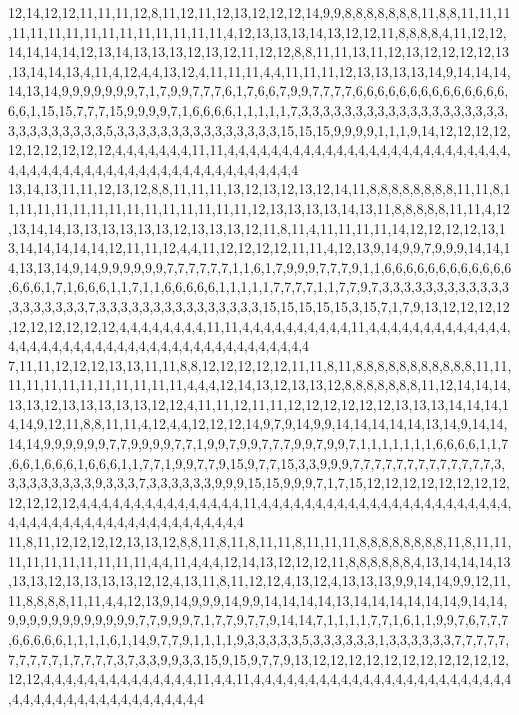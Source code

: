 12,14,12,12,11,11,11,12,8,11,12,11,12,13,12,12,12,14,9,9,8,8,8,8,8,8,8,11,8,8,11,11,11,11,11,11,11,11,11,11,11,11,11,11,11,4,12,13,13,13,14,13,12,12,11,8,8,8,8,4,11,12,12,14,14,14,14,12,13,14,13,13,13,12,13,12,11,12,12,8,8,11,11,13,11,12,13,12,12,12,12,13,13,14,14,13,4,11,4,12,4,4,13,12,4,11,11,11,4,4,11,11,11,12,13,13,13,13,14,9,14,14,14,14,13,14,9,9,9,9,9,9,9,7,1,7,9,9,7,7,7,6,1,7,6,6,7,9,9,7,7,7,7,6,6,6,6,6,6,6,6,6,6,6,6,6,6,6,6,1,15,15,7,7,7,15,9,9,9,9,7,1,6,6,6,6,1,1,1,1,1,7,3,3,3,3,3,3,3,3,3,3,3,3,3,3,3,3,3,3,3,3,3,3,3,3,3,3,3,3,5,3,3,3,3,3,3,3,3,3,3,3,3,3,3,3,15,15,15,9,9,9,9,1,1,1,9,14,12,12,12,12,12,12,12,12,12,12,4,4,4,4,4,4,4,11,11,4,4,4,4,4,4,4,4,4,4,4,4,4,4,4,4,4,4,4,4,4,4,4,4,4,4,4,4,4,4,4,4,4,4,4,4,4,4,4,4,4,4,4,4,4,4,4,4,4,4,4,4,4
13,14,13,11,11,12,13,12,8,8,11,11,11,13,12,13,12,13,12,14,11,8,8,8,8,8,8,8,8,11,11,8,11,11,11,11,11,11,11,11,11,11,11,11,11,11,12,13,13,13,13,14,13,11,8,8,8,8,8,11,11,4,12,13,14,14,13,13,13,13,13,13,12,13,13,13,12,11,8,11,4,11,11,11,11,14,12,12,12,12,13,13,14,14,14,14,14,12,11,11,12,4,4,11,12,12,12,12,11,11,4,12,13,9,14,9,9,7,9,9,9,14,14,14,13,13,14,9,14,9,9,9,9,9,9,7,7,7,7,7,7,1,1,6,1,7,9,9,9,7,7,7,9,1,1,6,6,6,6,6,6,6,6,6,6,6,6,6,6,6,1,7,1,6,6,6,1,1,7,1,1,6,6,6,6,6,1,1,1,1,1,7,7,7,7,1,1,7,7,9,7,3,3,3,3,3,3,3,3,3,3,3,3,3,3,3,3,3,3,3,7,3,3,3,3,3,3,3,3,3,3,3,3,3,3,3,15,15,15,15,15,3,15,7,1,7,9,13,12,12,12,12,12,12,12,12,12,12,4,4,4,4,4,4,4,4,11,11,4,4,4,4,4,4,4,4,4,4,11,4,4,4,4,4,4,4,4,4,4,4,4,4,4,4,4,4,4,4,4,4,4,4,4,4,4,4,4,4,4,4,4,4,4,4,4,4,4,4,4,4
7,11,11,12,12,12,13,13,11,11,8,8,12,12,12,12,12,11,11,8,11,8,8,8,8,8,8,8,8,8,8,8,11,11,11,11,11,11,11,11,11,11,11,11,4,4,4,12,14,13,12,13,13,12,8,8,8,8,8,8,8,11,12,14,14,14,13,13,12,13,13,13,13,13,12,12,4,11,11,12,11,11,12,12,12,12,12,12,13,13,13,14,14,14,14,14,9,12,11,8,8,11,11,4,12,4,4,12,12,12,14,9,7,9,14,9,9,14,14,14,14,14,13,14,9,14,14,14,14,9,9,9,9,9,9,7,7,9,9,9,9,7,7,1,9,9,7,9,9,7,7,7,9,9,7,9,9,7,1,1,1,1,1,1,1,6,6,6,6,1,1,7,6,6,1,6,6,6,1,6,6,6,1,1,7,7,1,9,9,7,7,9,15,9,7,7,15,3,3,9,9,9,7,7,7,7,7,7,7,7,7,7,7,7,7,3,3,3,3,3,3,3,3,3,9,3,3,3,7,3,3,3,3,3,3,9,9,9,15,15,9,9,9,7,1,7,15,12,12,12,12,12,12,12,12,12,12,12,12,4,4,4,4,4,4,4,4,4,4,4,4,4,4,4,11,4,4,4,4,4,4,4,4,4,4,4,4,4,4,4,4,4,4,4,4,4,4,4,4,4,4,4,4,4,4,4,4,4,4,4,4,4,4,4,4,4,4,4,4,4
11,8,11,12,12,12,12,13,13,12,8,8,11,8,11,8,11,11,8,11,11,11,8,8,8,8,8,8,8,8,11,8,11,11,11,11,11,11,11,11,11,11,4,4,11,4,4,4,12,14,13,12,12,12,11,8,8,8,8,8,8,4,13,14,14,14,13,13,13,12,13,13,13,13,12,12,4,13,11,8,11,12,12,4,13,12,4,13,13,13,9,9,14,14,9,9,12,11,11,8,8,8,8,11,11,4,4,12,13,9,14,9,9,9,14,9,9,14,14,14,14,13,14,14,14,14,14,14,9,14,14,9,9,9,9,9,9,9,9,9,9,9,9,7,7,9,9,9,7,1,7,7,9,7,7,9,14,14,7,1,1,1,1,7,7,1,6,1,1,9,9,7,6,7,7,7,6,6,6,6,6,1,1,1,1,6,1,14,9,7,7,9,1,1,1,1,9,3,3,3,3,3,5,3,3,3,3,3,3,1,3,3,3,3,3,3,7,7,7,7,7,7,7,7,7,7,1,7,7,7,7,3,7,3,3,9,9,3,3,15,9,15,9,7,7,9,13,12,12,12,12,12,12,12,12,12,12,12,12,12,4,4,4,4,4,4,4,4,4,4,4,4,4,4,11,4,4,11,4,4,4,4,4,4,4,4,4,4,4,4,4,4,4,4,4,4,4,4,4,4,4,4,4,4,4,4,4,4,4,4,4,4,4,4,4,4,4,4,4,4
